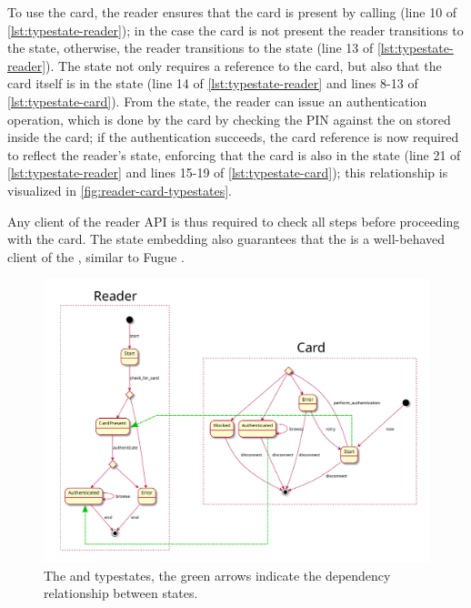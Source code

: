 To use the card, the reader ensures that the card is present by calling 
(line 10 of \autoref{lst:typestate-reader});
in the case the card is not present the reader transitions to the \textcolor{structblue}{} state,
otherwise, the reader transitions to the \textcolor{structblue}{} state (line 13 of \autoref{lst:typestate-reader}).
The \textcolor{structblue}{} state not only requires a reference to the card,
but also that the card itself is in the \textcolor{structblue}{} state (line 14 of \autoref{lst:typestate-reader}
and lines 8-13 of \autoref{lst:typestate-card}).
From the \textcolor{structblue}{} state, the reader can issue an authentication operation,
which is done by the card by checking the PIN against the on stored inside the card;
if the authentication succeeds, the card reference is now required to reflect the reader's state,
enforcing that the card is also in the \textcolor{structblue}{} state
(line 21 of \autoref{lst:typestate-reader} and lines 15-19 of \autoref{lst:typestate-card});
this relationship is visualized in \autoref{fig:reader-card-typestates}.

Any client of the reader API is thus required to check all steps before proceeding with the card.
The state embedding also guarantees that the \textcolor{structblue}{} is a well-behaved client of the \textcolor{structblue}{},
similar to Fugue \autocite{DeLine2004}.

\begin{figure}
    \centering
    \includegraphics[width=\linewidth]{Chapters/Figures/C5/reader_typestates.pdf}
    \caption{
        The \textcolor{structblue}{} and \textcolor{structblue}{} typestates,
        the green arrows indicate the dependency relationship between states.
    }
    \label{fig:reader-card-typestates}
\end{figure}

